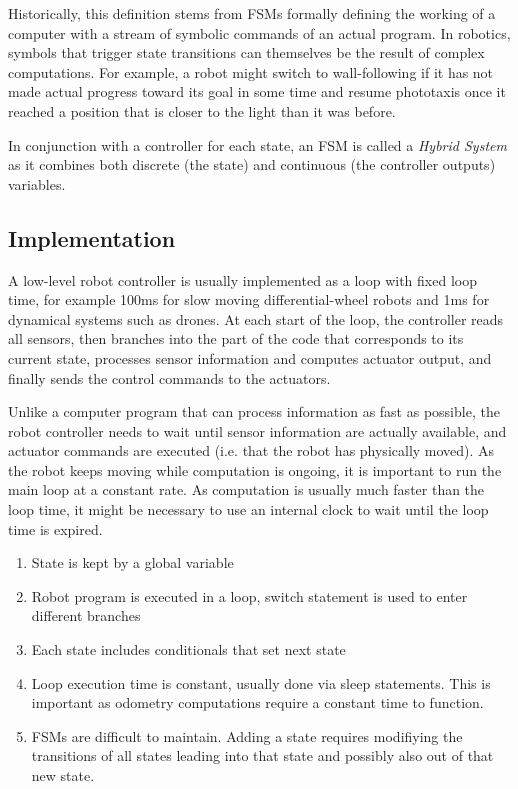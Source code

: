 Historically, this definition stems from FSMs formally defining the working of a computer with a stream of symbolic commands of an actual program. In robotics, symbols that trigger state transitions can themselves be the result of complex computations. For example, a robot might switch to wall-following if it has not made actual progress toward its goal in some time and resume phototaxis once it reached a position that is closer to the light than it was before. 

In conjunction with a controller for each state, an FSM is called a \emph{Hybrid System}\cite{van2000introduction} as it combines both discrete (the state) and continuous (the controller outputs) variables. 

\subsection{Implementation}
A low-level robot controller is usually implemented as a loop with fixed loop time, for example 100ms for slow moving differential-wheel robots and 1ms for dynamical systems such as drones. At each start of the loop, the controller reads all sensors, then branches into the part of the code that corresponds to its current state, processes sensor information and computes actuator output, and finally sends the control commands to the actuators. 

Unlike a computer program that can process information as fast as possible, the robot controller needs to wait until sensor information are actually available, and actuator commands are executed (i.e. that the robot has physically moved). As the robot keeps moving while computation is ongoing, it is important to run the main loop at a constant rate. As computation is usually much faster than the loop time, it might be necessary to use an internal clock to wait until the loop time is expired. 





\begin{enumerate}
\item State is kept by a global variable
\item Robot program is executed in a loop, switch statement is used to enter different branches
\item Each state includes conditionals that set next state
\item Loop execution time is constant, usually done via sleep statements. This is important as odometry computations require a constant time to function.
\item FSMs are difficult to maintain. Adding a state requires modifiying the transitions of all states leading into that state and possibly also out of that new state.
\end{enumerate}

